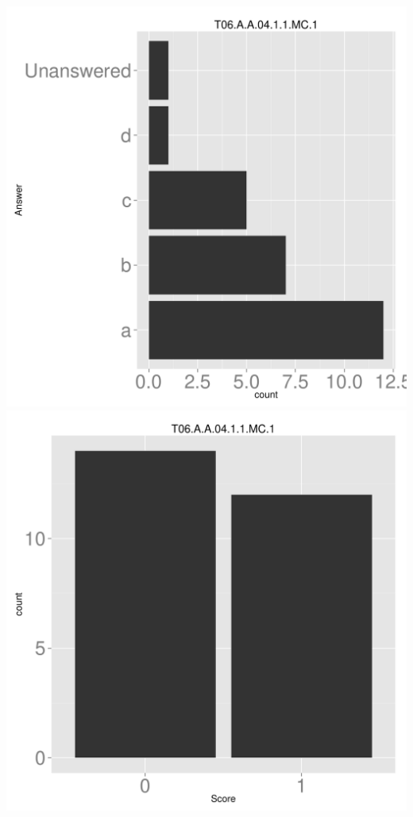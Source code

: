 \documentclass[12pt,nohyper]{tufte-handout}\usepackage[]{graphicx}\usepackage[]{color}
\begin{document}
\begin{center} \includegraphics[width=.45\linewidth]{Topic06_1_answer} \includegraphics[width=.45\linewidth]{Topic06_1_score} \end{center} 
\end{document}
